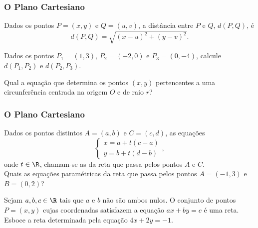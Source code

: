 \begin{frame}
    \frametitle{O Plano Cartesiano}

    \begin{proposicao}
        Dados os pontos $P=(x,y)$ e $Q=(u,v)$, a distância entre $P$ e $Q$, $d(P,Q)$, é 
        $$d(P, Q) = \sqrt{(x-u)^2+(y-v)^2}.$$
    \end{proposicao}\pause

    \begin{exemplo}
        Dados os pontos $P_1 = (1,3)$, $P_2=(-2,0)$ e $P_3 = (0, -4)$, calcule $d(P_1,P_2)$ e $d(P_2, P_3)$.
    \end{exemplo}\pause

    \begin{exemplo}
        Qual a equação que determina os pontos $(x,y)$ pertencentes a uma circunferência centrada na origem $O$ e de raio $r$?
    \end{exemplo}

\end{frame}

\begin{frame}
    \frametitle{O Plano Cartesiano}

    \begin{exemplo}
        Dados os pontos distintos $A=(a,b)$ e $C=(c,d)$, as equações
        $$\begin{cases}
            x = a + t(c-a)\\
            y = b + t(d-b)
        \end{cases},$$
        onde $t\in \R$, chamam-se as  da reta que passa pelos pontos $A$ e $C$.\\
        Quais as equações paramétricas da reta que passa pelos pontos $A=(-1,3)$ e $B=(0,2)$?
    \end{exemplo}\pause

    \begin{exemplo}
        Sejam $a,b, c \in \R$ tais que $a$ e $b$ não são ambos nulos. O conjunto de pontos $P= (x,y)$ cujas coordenadas satisfazem a equação $ax +by = c$ é uma reta.\\
        Esboce a reta determinada pela equação $4x+2y = -1$.
    \end{exemplo}

\end{frame}
